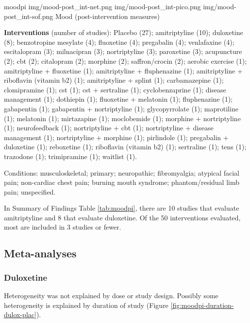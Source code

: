 \documentclass{report}\usepackage[]{graphicx}\usepackage[]{color}
\begin{document}
\soffignew
{moodpi}
{img/mood-post_int-net.png}
{img/mood-post_int-pico.png}
{img/mood-post_int-sof.png}
{Mood (post-intervention measures)}

\textbf{Interventions} (number of studies): Placebo (27); amitriptyline (10); duloxetine (8); benzotropine mesylate (4); fluoxetine (4); pregabalin (4); venlafaxine (4); escitalopram (3); milnacipran (3); nortriptyline (3); paroxetine (3); acupuncture (2); cbt (2); citalopram (2); morphine (2); saffron/crocin (2); aerobic exercise (1); amitriptyline + fluoxetine (1); amitriptyline + fluphenazine (1); amitriptyline + riboflavin (vitamin b2) (1); amitriptyline + splint (1); carbamazepine (1); clomipramine (1); cst (1); cst + sertraline (1); cyclobenzaprine (1); disease management (1); dothiepin (1); fluoxetine + melatonin (1); fluphenazine (1); gabapentin (1); gabapentin + nortriptyline (1); glycopyrrolate (1); maprotiline (1); melatonin (1); mirtazapine (1); moclobemide (1); morphine + nortriptyline (1); neurofeedback (1); nortriptyline + cbt (1); nortriptyline + disease management (1); nortriptyline + morphine (1); pirlindole (1); pregabalin + duloxetine (1); reboxetine (1); riboflavin (vitamin b2) (1); sertraline (1); tens (1); trazodone (1); trimipramine (1); waitlist (1).

Conditions: musculoskeletal; primary; neuropathic; fibromyalgia; atypical facial pain; non-cardiac chest pain; burning mouth syndrome; phantom/residual limb pain; unspecified.

In Summary of Findings Table \ref{tab:moodpi}, there are 10 studies that evaluate amitriptyline and 8 that evaluate duloxetine. Of the 50 interventions evaluated, most are included in 3 studies or fewer.

\subsection{Meta-analyses}

\subsubsection{Duloxetine}

Heterogeneity was not explained by dose or study design. Possibly some heterogeneity is explained by duration of study (Figure \ref{fig:moodpi-duration-dulox-plac}).
\end{document}
